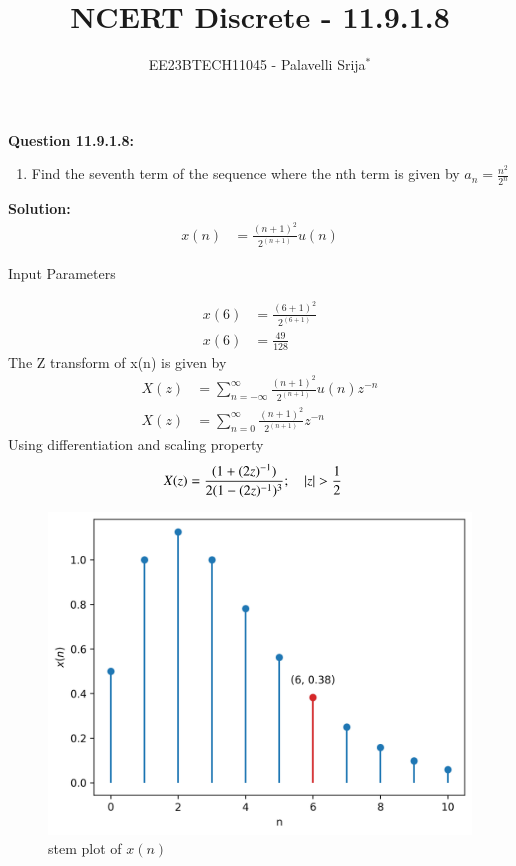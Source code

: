 \documentclass[journal,12pt,twocolumn]{IEEEtran}
\theoremstyle{remark}
\begin{document}

\vspace{3cm}

\title{NCERT Discrete - 11.9.1.8}
\author{EE23BTECH11045 - Palavelli Srija$^{*}$%
}
\maketitle
\newpage
\bigskip

\renewcommand{\thefigure}{\theenumi}
\renewcommand{\thetable}{\theenumi}

\vspace{3cm}
\textbf{Question 11.9.1.8:} 
\begin{enumerate}
\item Find the seventh term of the sequence where the nth term is given by $a_n= \frac {n^2}{2^{n}}$

\end{enumerate}
\textbf{Solution: }
\begin{align}
 x(n) &= \frac{(n+1)^2}{2^{(n+1)}}u(n)
\end{align}
\begin{table}[h!]
    \centering
    
    \caption{Input Parameters}
    \label{tab:table_9.8.1}
   \end{table}
\begin{align}
x(6) &= \frac{(6+1)^2}{2^{(6+1)}}\\
x(6) &= \frac {49}{128}
\end{align}
The Z transform of x(n) is given by
\begin{align}
X(z) &= \sum_{n=-\infty}^{\infty} \frac{(n+1)^2}{2^{(n+1)}}u(n) z^{-n}\\
X(z) &= \sum_{n=0}^{\infty} \frac {(n+1)^2}{2^{(n+1)}}z^{-n}
\end{align}
Using differentiation and scaling property
\begin{align}
X(z) &=  \frac {(1+(2z)^{-1})}{2(1-(2z)^{-1})^{3}}; \quad \left\vert z\right\vert > \frac{1}{2}
\end{align}
\begin{figure}[h!]
    \centering
    \includegraphics[width=\columnwidth]{figs/plot.png}
    \caption{stem plot of $x(n)$}
    \label{fig:1}
\end{figure}
\end{document}

